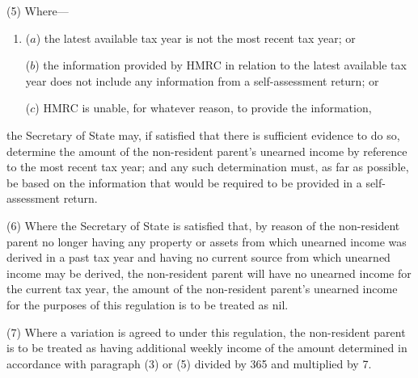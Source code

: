\documentclass[12pt,a4paper]{article}
\begin{document}
(5) Where—
\begin{enumerate}\item[]
($a$) the latest available tax year is not the most recent tax year; or

($b$) the information provided by HMRC in relation to the latest available tax year does not include any information from a self-assessment return;
or

($c$) HMRC is unable, for whatever reason, to provide the information,
%
\end{enumerate}
the Secretary of State may, if satisfied that there is sufficient evidence to do so, determine the amount of the non-resident parent’s unearned income by reference to the most recent tax year; and any such determination must, as far as possible, be based on the information that would be required to be provided in a self-assessment return.

(6) Where the Secretary of State is satisfied that, by reason of the non-resident parent no longer having any property or assets from which unearned income was derived in a past tax year and having no current source from which unearned income may be derived, the non-resident parent will have no unearned income for the current tax year, the amount of the non-resident parent’s unearned income for the purposes of this regulation is to be treated as nil.

(7) Where a variation is agreed to under this regulation, the non-resident parent is to be treated as having additional weekly income of the amount determined in accordance with paragraph (3) or (5) divided by 365 and multiplied by 7.

%
\end{document}
